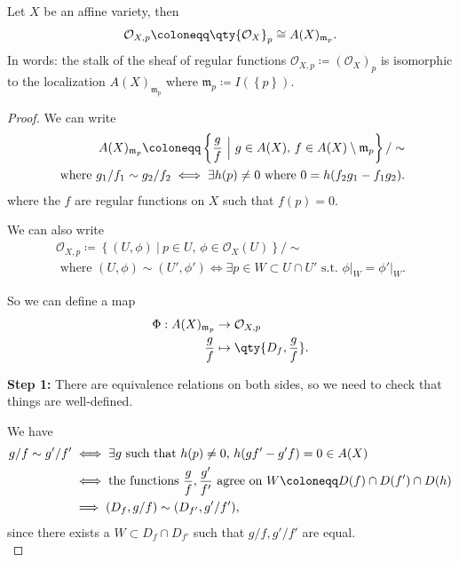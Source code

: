 \begin{lemma}

Let \(X\) be an affine variety, then
\begin{align*}  
{\mathcal{O}}_{X, p}\coloneqq\qty{{\mathcal{O}}_X}_p \cong A(X)_{\mathfrak{m}_p}
.\end{align*}
In words: the stalk of the sheaf of regular functions
\({\mathcal{O}}_{X, p} \coloneqq({\mathcal{O}}_X)_p\) is isomorphic to
the localization \(A(X)_{{\mathfrak{m}}_p}\) where
\({\mathfrak{m}}_p \coloneqq I(\left\{{p}\right\})\).

\end{lemma}

\begin{proof}

We can write
\begin{align*}  
A(X)_{{\mathfrak{m}}_p} \coloneqq\left\{{{g\over f} {~\mathrel{\Big|}~}g\in A(X),\, f\in A(X)\setminus{\mathfrak{m}}_p}\right\} / \sim \\
\text{ where } g_1/f_1 \sim g_2/f_2 \iff \exists h(p) \neq 0 \text{ where }0 = h(f_2 g_1 - f_1 g_2)
.\end{align*}
where the \(f\) are regular functions on \(X\) such that \(f(p) = 0\).

We can also write
\begin{align*}  
{\mathcal{O}}_{X, p} \coloneqq\left\{{(U, \phi) {~\mathrel{\Big|}~}p\in U,\, \phi \in {\mathcal{O}}_X(U) }\right\} /\sim 
\\ \text{ where } (U, \phi) \sim (U', \phi') 
\iff \exists p\in W \subset U\cap U' \text{ s.t. } { \left.{{\phi}} \right|_{{W}} } = { \left.{{\phi'}} \right|_{{W}} }
.\end{align*}

So we can define a map
\begin{align*}  
\Phi: A(X)_{{\mathfrak{m}}_p} &\to {\mathcal{O}}_{X, p} \\
{g\over f} &\mapsto \qty{D_f, {g\over f}}
.\end{align*}

\textbf{Step 1:} There are equivalence relations on both sides, so we
need to check that things are well-defined.

We have
\begin{align*}  
g/f \sim g'/f' &\iff \exists g \text{ such that } h(p) \neq 0,\, h(gf' - g'f)=0 \in A(X) \\
&\iff \text{the functions } {g\over f}, {g' \over f'} \text{ agree on } W\coloneqq D(f) \cap D(f') \cap D(h) \\
&\implies (D_f, g/f) \sim (D_{f'}, g'/f')
,\end{align*}
since there exists a \(W\subset D_f \cap D_{f'}\) such that
\(g/f, g'/f'\) are equal.\\


\end{proof}
